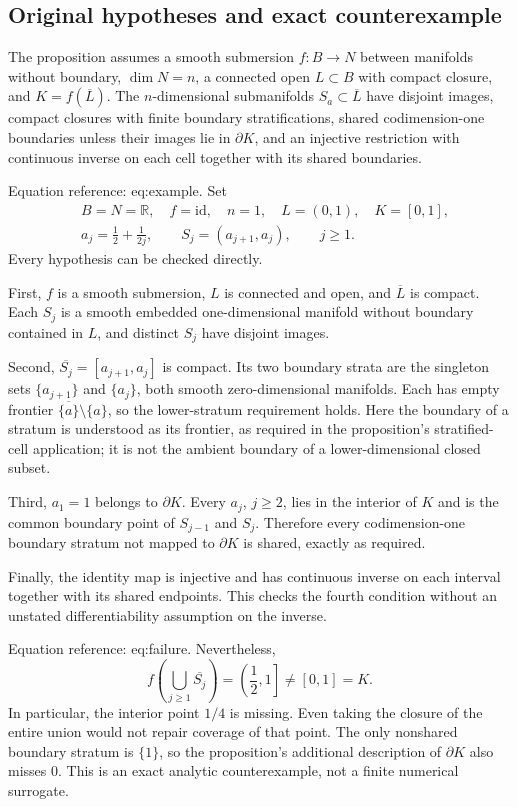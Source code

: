 \documentclass[10pt]{article}
\begin{document}
\subsection*{Original hypotheses and exact counterexample}
The proposition assumes a smooth submersion \(f:B\to N\) between manifolds without boundary, \(\dim N=n\), a connected open \(L\subset B\) with compact closure, and \(K=f(\overline L)\). The \(n\)-dimensional submanifolds \(S_a\subset\overline L\) have disjoint images, compact closures with finite boundary stratifications, shared codimension-one boundaries unless their images lie in \(\partial K\), and an injective restriction with continuous inverse on each cell together with its shared boundaries.\par
Equation reference: eq:example. Set \[
 \begin{aligned}
 &B=N=\mathbb R,\quad f=\mathrm{id},\quad n=1,\quad
 L=(0,1),\quad K=[0,1],\\
 &a_j=\frac12+\frac1{2j},\qquad S_j=(a_{j+1},a_j),\qquad j\ge1.
 \end{aligned}\] Every hypothesis can be checked directly.\par
First, \(f\) is a smooth submersion, \(L\) is connected and open, and \(\overline L\) is compact. Each \(S_j\) is a smooth embedded one-dimensional manifold without boundary contained in \(L\), and distinct \(S_j\) have disjoint images.\par
Second, \(\overline{S_j}=[a_{j+1},a_j]\) is compact. Its two boundary strata are the singleton sets \(\{a_{j+1}\}\) and \(\{a_j\}\), both smooth zero-dimensional manifolds. Each has empty frontier \(\overline{\{a\}}\setminus\{a\}\), so the lower-stratum requirement holds. Here the boundary of a stratum is understood as its frontier, as required in the proposition’s stratified-cell application; it is not the ambient boundary of a lower-dimensional closed subset.\par
Third, \(a_1=1\) belongs to \(\partial K\). Every \(a_j\), \(j\ge2\), lies in the interior of \(K\) and is the common boundary point of \(S_{j-1}\) and \(S_j\). Therefore every codimension-one boundary stratum not mapped to \(\partial K\) is shared, exactly as required.\par
Finally, the identity map is injective and has continuous inverse on each interval together with its shared endpoints. This checks the fourth condition without an unstated differentiability assumption on the inverse.\par
Equation reference: eq:failure. Nevertheless, \[
 f\left(\bigcup_{j\ge1}\overline{S_j}\right)
 =\left(\frac12,1\right]\ne[0,1]=K .\] In particular, the interior point \(1/4\) is missing. Even taking the closure of the entire union would not repair coverage of that point. The only nonshared boundary stratum is \(\{1\}\), so the proposition’s additional description of \(\partial K\) also misses \(0\). This is an exact analytic counterexample, not a finite numerical surrogate.\par
\end{document}
